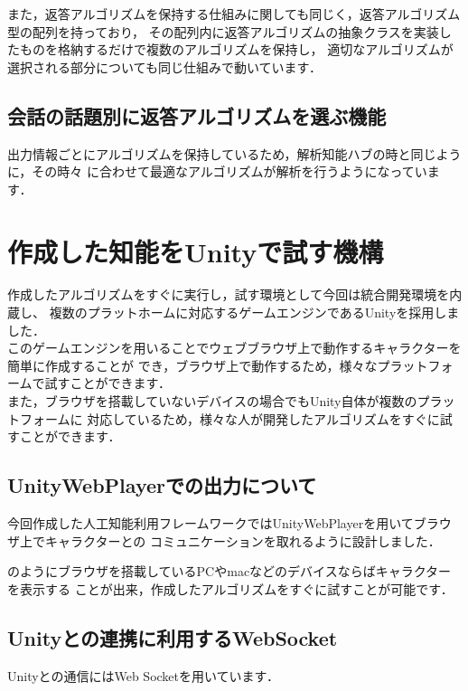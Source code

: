 また，返答アルゴリズムを保持する仕組みに関しても同じく，返答アルゴリズム型の配列を持っており，
その配列内に返答アルゴリズムの抽象クラスを実装したものを格納するだけで複数のアルゴリズムを保持し，
適切なアルゴリズムが選択される部分についても同じ仕組みで動いています．\\

\subsection{会話の話題別に返答アルゴリズムを選ぶ機能}
出力情報ごとにアルゴリズムを保持しているため，解析知能ハブの時と同じように，その時々
に合わせて最適なアルゴリズムが解析を行うようになっています．


\newpage


\section{作成した知能をUnityで試す機構}
作成したアルゴリズムをすぐに実行し，試す環境として今回は統合開発環境を内蔵し、
複数のプラットホームに対応するゲームエンジンであるUnityを採用しました．\\

このゲームエンジンを用いることでウェブブラウザ上で動作するキャラクターを簡単に作成することが
でき，ブラウザ上で動作するため，様々なプラットフォームで試すことができます．\\

また，ブラウザを搭載していないデバイスの場合でもUnity自体が複数のプラットフォームに
対応しているため，様々な人が開発したアルゴリズムをすぐに試すことができます．

\subsection{UnityWebPlayerでの出力について}
今回作成した人工知能利用フレームワークではUnityWebPlayerを用いてブラウザ上でキャラクターとの
コミュニケーションを取れるように設計しました．\\


のようにブラウザを搭載しているPCやmacなどのデバイスならばキャラクターを表示する
ことが出来，作成したアルゴリズムをすぐに試すことが可能です．\\

\subsection{Unityとの連携に利用するWebSocket}
Unityとの通信にはWeb Socketを用いています．\\


